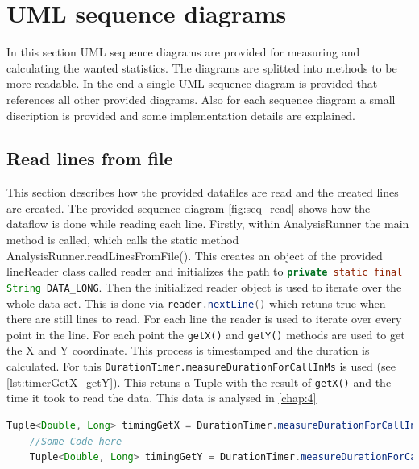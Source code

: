 \section{UML sequence diagrams}
\label{sec:seq_diagrams}
In this section UML sequence diagrams are provided for measuring and calculating the wanted statistics. The diagrams are splitted into methods to be more readable. In the end a single UML sequence diagram is provided that references all other provided diagrams. Also for each sequence diagram a small discription is provided and some implementation details are explained.

\subsection{Read lines from file}
This section describes how the provided datafiles are read and the created lines are created. The provided sequence diagram \ref{fig:seq_read} shows how the dataflow is done while reading each line. Firstly, within AnalysisRunner the main method is called, which calls the static method AnalysisRunner.readLinesFromFile(). This creates an object of the provided lineReader class called reader and initializes the path to \lstinline[language=java]{private static final String DATA_LONG}. Then the initialized reader object is used to iterate over the whole data set. This is done via \lstinline[language=java]{reader.nextLine()} which retuns true when there are still lines to read. For each line the reader is used to iterate over every point in the line. For each point the \texttt{getX()} and \texttt{getY()} methods are used to get the X and Y coordinate. This process is timestamped and the duration is calculated. For this \texttt{DurationTimer.measureDurationForCallInMs} is used (see \ref{lst:timerGetX_getY}). This retuns a Tuple with the result of \texttt{getX()} and the time it took to read the data. This data is analysed in \ref{chap:4}

\begin{lstlisting}[language=java, caption=Measure duration for calls getX, label=lst:timerGetX_getY]
    Tuple<Double, Long> timingGetX = DurationTimer.measureDurationForCallInMs(() -> reader.getX());
    //Some Code here
    Tuple<Double, Long> timingGetY = DurationTimer.measureDurationForCallInMs(() -> reader.getY());
\end{lstlisting}

